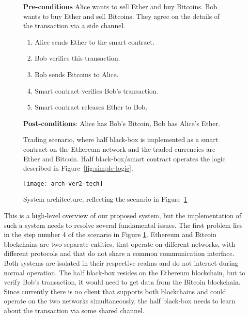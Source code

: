 \begin{figure}[ht]
    \begin{framed}
    \textbf{Pre-conditions} Alice wants to sell Ether and buy Bitcoins. Bob wants to buy Ether and sell Bitcoins. They agree on the details of the transaction via a side channel.
 
    \begin{enumerate}[noitemsep]
        \item Alice sends Ether to the smart contract.
        \item Bob verifies this transaction.
        \item Bob sends Bitcoins to Alice.
        \item Smart contract verifies Bob’s transaction.
        \item Smart contract releases Ether to Bob.
    \end{enumerate}
      
    \textbf{Post-conditions}: Alice has Bob’s Bitcoin, Bob has Alice’s Ether.

    \end{framed}
    \caption{Trading scenario, where half black-box is implemented as a smart contract on the Ethereum network and the traded currencies are Ether and Bitcoin. Half black-box/smart contract operates the logic described in Figure~\ref{fig:simple-logic}.}
    \label{fig:ethereum-case}
\end{figure}

\begin{figure}[ht]
    \centering
    \texttt{[image: arch-ver2-tech]}
    \caption{System architecture, reflecting the scenario in Figure~\ref{fig:ethereum-case}}
    \label{fig:arch-ver2-tech}
\end{figure}

This is a high-level overview of our proposed system, but the implementation of such a system needs to resolve several fundamental issues. The first problem lies in the step number 4 of the scenario in Figure \ref{fig:ethereum-case}. Ethereum and Bitcoin blockchains are two separate entities, that operate on different networks, with different protocols and that do not share a common communication interface. Both systems are isolated in their respective realms and do not interact during normal operation\footnotemark. The half black-box resides on the Ethereum blockchain, but to verify Bob’s transaction, it would need to get data from the Bitcoin blockchain. Since currently there is no client that supports both blockchains and could operate on the two networks simultaneously, the half black-box needs to learn about the transaction via some shared channel.
% 

